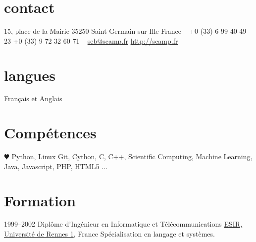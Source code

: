 \documentclass[]{friggeri-cv} %
\begin{document}


\begin{aside} %
\section{contact}
15, place de la Mairie
35250 Saint-Germain sur Ille
France
~
+0 (33) 6 99 40 49 23
+0 (33) 9 72 32 60 71
~
\href{mailto:sebastien.campion@gmail.com}{seb@scamp.fr}
\href{http://scamp.fr}{http://scamp.fr}
\section{langues}
Français et Anglais
\section{Compétences}
{\color{red} $\varheartsuit$} Python, %
Linux
Git, Cython, C, C++, Scientific Computing, Machine Learning, Java, Javascript, PHP, HTML5
...
\end{aside}


\section{Formation}

\begin{entrylist}
\entry
{1999--2002}
{Diplôme d'Ingénieur   {\normalfont en Informatique et Télécommunications}}
{\href{https://esir.univ-rennes1.fr}{ESIR, Université de Rennes 1}, France}
{Spécialisation en langage et systèmes.}
\end{entrylist}
\end{document}
